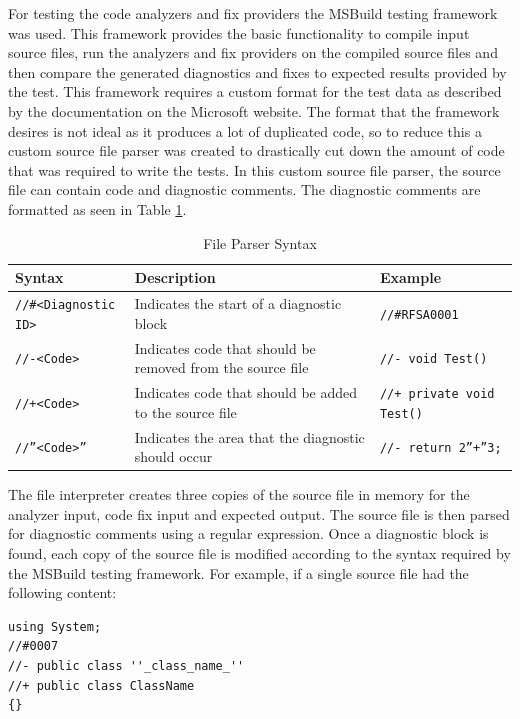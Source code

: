 For testing the code analyzers and fix providers the MSBuild testing framework was used. This framework provides the basic functionality to compile input source files, run the analyzers and fix providers on the compiled source files and then compare the generated diagnostics and fixes to expected results provided by the test.
This framework requires a custom format for the test data as described by the documentation on the Microsoft website. The format that the framework desires is not ideal as it produces a lot of duplicated code, so to reduce this a custom source file parser was created to drastically cut down the amount of code that was required to write the tests. In this custom source file parser, the source file can contain code and diagnostic comments. The diagnostic comments are formatted as seen in Table \ref{tab:FileParserSyntax}.
\begin{table}[H]
    \centering
    \caption{File Parser Syntax}
    \label{tab:FileParserSyntax}
    \begin{tabular}{|p{3.5cm}|p{8cm}|p{4cm}|}
        \hline
        Syntax&Description&Example\\
        \hline
        \texttt{//\#\textless Diagnostic ID\textgreater}&Indicates the start of a diagnostic block&\texttt{//\#RFSA0001}\\
        \texttt{//-\textless Code\textgreater}&Indicates code that should be removed from the source file&\texttt{//- void Test()}\\
        \texttt{//+\textless Code\textgreater}&Indicates code that should be added to the source file&\texttt{//+ private void Test()}\\
        \texttt{//''\textless Code\textgreater''}&Indicates the area that the diagnostic should occur&\texttt{//- return 2''+''3; }\\
        \hline
    \end{tabular}
\end{table}

The file interpreter creates three copies of the source file in memory for the analyzer input, code fix input and expected output. The source file is then parsed for diagnostic comments using a regular expression. Once a diagnostic block is found, each copy of the source file is modified according to the syntax required by the MSBuild testing framework.
For example, if a single source file had the following content:
\begin{lstlisting}[style=sharpc]
using System;
//#0007
//- public class ''_class_name_''
//+ public class ClassName
{}
\end{lstlisting}

